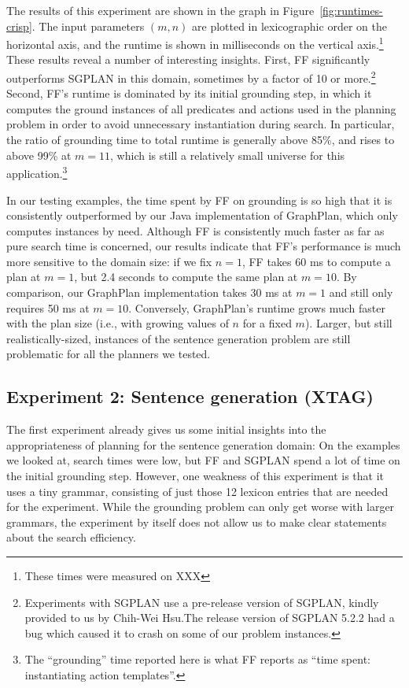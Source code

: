 The results of this experiment are shown in the graph in
Figure~\ref{fig:runtimes-crisp}. The input parameters $(m,n)$ are
plotted in lexicographic order on the horizontal axis, and the runtime
is shown in milliseconds on the vertical axis.\footnote{These times
  were measured on XXX} These results reveal a number of interesting
insights. First, FF significantly outperforms SGPLAN in this domain,
sometimes by a factor of 10 or more.\footnote{Experiments with SGPLAN
  use a pre-release version of SGPLAN, kindly provided to us by
  Chih-Wei Hsu.The release version of SGPLAN 5.2.2 had a bug which
  caused it to crash on some of our problem instances.}  Second, FF's
runtime is dominated by its initial grounding step, in which it
computes the ground instances of all predicates and actions used in
the planning problem in order to avoid unnecessary instantiation
during search.  In particular, the ratio of grounding time to total
runtime is generally above 85\%, and rises to above 99\% at $m=11$,
which is still a relatively small universe for this
application.\footnote{The ``grounding'' time reported here is what FF
  reports as ``time spent: instantiating action templates''.}

In our testing examples, the time spent by FF on grounding is so high
that it is consistently outperformed by our Java implementation of
GraphPlan, which only computes instances by need. Although FF is
consistently much faster as far as pure search time is concerned, our
results indicate that FF's performance is much more sensitive to the
domain size: if we fix $n=1$, FF takes 60 ms to compute a plan at
$m=1$, but 2.4 seconds to compute the same plan at $m=10$. By
comparison, our GraphPlan implementation takes 30 ms at $m=1$ and
still only requires 50 ms at $m=10$. Conversely, GraphPlan's runtime
grows much faster with the plan size (i.e., with growing values of $n$
for a fixed $m$). Larger, but still realistically-sized, instances of
the sentence generation problem are still problematic for all the
planners we tested.



\subsection{Experiment 2: Sentence generation (XTAG)}
\label{sec:exper-2:-sent-xtag}

The first experiment already gives us some initial insights into the
appropriateness of planning for the sentence generation domain: On the
examples we looked at, search times were low, but FF and SGPLAN spend
a lot of time on the initial grounding step.  However, one weakness of
this experiment is that it uses a tiny grammar, consisting of just
those 12 lexicon entries that are needed for the experiment. While the
grounding problem can only get worse with larger grammars, the
experiment by itself does not allow us to make clear statements about
the search efficiency.

